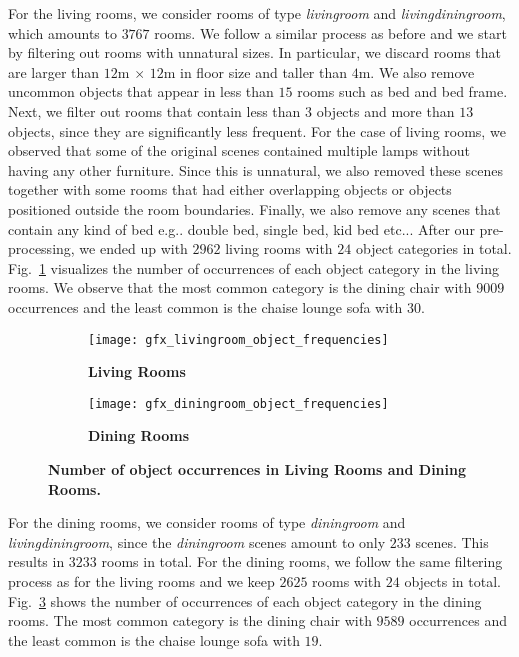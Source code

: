\documentclass{article}
\makeatletter
\DeclareRobustCommand\onedot{\futurelet\@let@token\@onedot}
\def\@onedot{\ifx\@let@token.\else.\null\fi\xspace}
\def\eg{e.g\onedot} \def\Eg{E.g\onedot}
\def\etc{etc\onedot}
\newcommand{\boldparagraph}[1]{\vspace{0.2cm}\noindent{\bf #1:} }
\newcommand{\figref}[1]{Fig.~\ref{#1}}
\makeatother
\begin{document}
\boldparagraph{Living Room}For the living rooms, we consider rooms of type \emph{livingroom} and
\emph{livingdiningroom}, which amounts to $3767$ rooms. We follow a similar
process as before and we start by filtering out rooms with unnatural sizes.  In
particular, we discard rooms that are larger than $12$m $\times$ $12$m in floor
size and taller than $4$m. We also remove uncommon objects that appear in less
than $15$ rooms such as bed and bed frame. Next, we filter out rooms that
contain less than $3$ objects and more than $13$ objects, since they are
significantly less frequent. For the case of living rooms, we observed that
some of the original scenes contained multiple lamps without having any other
furniture. Since this is unnatural, we also removed these scenes together with
some rooms that had either overlapping objects or objects positioned outside
the room boundaries. Finally, we also remove any scenes that contain any kind
of bed \eg double bed, single bed, kid bed \etc.  After our pre-processing, we
ended up with $2962$ living rooms with $24$ object categories in total.
\figref{fig:livingroom_object_frequencies} visualizes the number of occurrences
of each object category in the living rooms. We observe that the most common
category is the dining chair with $9009$ occurrences and the least common is
the chaise lounge sofa with $30$.
\begin{figure}[t!]
    \begin{subfigure}[t]{0.5\textwidth}
        \centering
        \texttt{[image: gfx\_livingroom\_object\_frequencies]}
        \vspace{-1.2em}
        \caption{{\bf{Living Rooms}}}
        \label{fig:livingroom_object_frequencies}
    \end{subfigure}\begin{subfigure}[t]{0.5\textwidth}
        \centering
        \texttt{[image: gfx\_diningroom\_object\_frequencies]}
        \vspace{-1.2em}
        \caption{{\bf{Dining Rooms}}}
        \label{fig:diningroom_object_frequencies}
    \end{subfigure}
    \caption{\bf{Number of object occurrences in Living Rooms and Dining Rooms.}}
    \vspace{-1.2em}
\end{figure}

\boldparagraph{Dining Room}For the dining rooms, we consider rooms of type \emph{diningroom} and
\emph{livingdiningroom}, since the \emph{diningroom} scenes amount to only $233$ scenes.
This results in $3233$ rooms in total. For the dining rooms,
we follow the same filtering process as for the living rooms and we keep
$2625$ rooms with $24$ objects in total. \figref{fig:diningroom_object_frequencies}
shows the number of occurrences of each object category in the dining rooms.
The most common category is the dining chair with $9589$
occurrences and the least common is the chaise lounge sofa with $19$.
\end{document}
